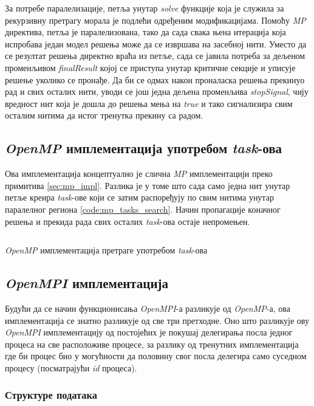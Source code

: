 За потребе паралелизације, петља унутар \textit{solve} функције која је служила за рекурзивну претрагу морала је подлећи одређеним модификацијама. Помоћу \textit{MP} директива, петља је паралелизована, тако да сада свака њена итерација која испробава један модел решења може да се извршава на засебној нити. Уместо да се резултат решења директно враћа из петље, сада се јавила потреба за дељеном променљивом \textit{finalResult} којој се приступа унутар критичне секције и уписује решење уколико се пронађе. Да би се одмах након проналаска решења прекинуо рад и свих осталих нити, уводи се још једна дељена променљива \textit{stopSignal}, чију вредност нит која је дошла до решења мења на \textit{true} и тако сигнализира свим осталим нитима да истог тренутка прекину са радом.

\subsection{\textit{OpenMP} имплементација употребом \textit{task}-ова}

Ова имплементација концептуално је слична \textit{MP} имплементацији преко примитива \ref{sec:mp_impl}. Разлика је у томе што сада само једна нит унутар петље креира \textit{task}-ове који се затим распоређују по свим нитима унутар паралелног региона \ref{code:mp_tasks_search}. Начин пропагације коначног решења и прекида рада свих осталих \textit{task}-ова остаје непромењен.

\begin{listing}[H]
\inputminted{c}{kodovi/mp_tasks_search.c}
\caption{\textit{OpenMP} имплементација претраге употребом \textit{task}-ова}
\label{code:mp_tasks_search}
\end{listing}

\subsection{\textit{OpenMPI} имплементација} 
Будући да се начин функционисања \textit{OpenMPI}-а \cite{open_mpi} разликује од \textit{OpenMP}-а, ова имплементација се знатно разликује од све три претходне.
Оно што разликује ову \textit{OpenMPI} имплементацију од постојећих је покушај делегирања посла једног процеса на све расположиве процесе, за разлику од тренутних имплементација где би процес био у могућности да половину свог посла делегира само суседном процесу (посматрајући \textit{id} процеса).\\

\subsubsection{Структуре података}

